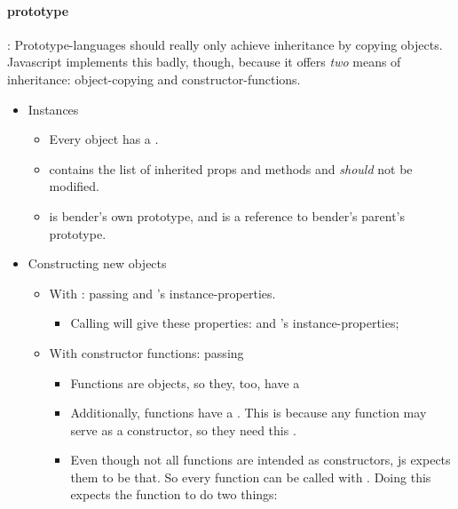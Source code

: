 \paragraph{prototype}: Prototype-languages should really only achieve inheritance by copying objects. Javascript implements this badly, though, because it offers \emph{two} means of inheritance: object-copying and constructor-functions.
\begin{itemize}
    \item Instances 
        \begin{itemize}
            \item Every object has a . 
            \item {} contains the list of inherited props and methods and \emph{should} not be modified.
            \item {} is bender's own prototype, and  is a reference to bender's parent's prototype.
        \end{itemize}
    \item Constructing new objects
        \begin{itemize}
            \item With : passing  and 's instance-properties.
                \begin{itemize}
                    \item Calling  will give  these properties:  and 's instance-properties;
                \end{itemize}
            \item With constructor functions: passing 
                \begin{itemize}
                    \item Functions are objects, so they, too, have a 
                    \item Additionally, functions have a . This is because any function may serve as a constructor, so they need this .
                    \item Even though not all functions are intended as constructors, js expects them to be that. So every function can be called with . Doing this expects the function to do two things:

\end{itemize}
\end{itemize}
\end{itemize}
